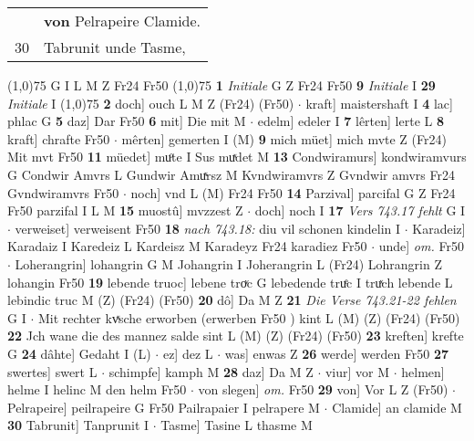 \documentclass[8pt,a4paper,notitlepage]{article}
\begin{document}
\begin{table}[ht]
\begin{minipage}[t]{0.5\linewidth}
\begin{tabular}{rl}
 & \textbf{von} Pelrapeire Clamide.\\ 
30 & Tabrunit unde Tasme,\\ 
\end{tabular}
\scriptsize
\line(1,0){75} \newline
G I L M Z Fr24 Fr50 \newline
\line(1,0){75} \newline
\textbf{1} \textit{Initiale} G Z Fr24 Fr50  \textbf{9} \textit{Initiale} I  \textbf{29} \textit{Initiale} I  \newline
\line(1,0){75} \newline
\textbf{2} doch] ouch L M Z (Fr24) (Fr50)  $\cdot$ kraft] maistershaft I \textbf{4} lac] phlac G \textbf{5} daz] Dar Fr50 \textbf{6} mit] Die mit M  $\cdot$ edelm] edeler I \textbf{7} lêrten] lerte L \textbf{8} kraft] chrafte Fr50  $\cdot$ mêrten] gemerten I (M) \textbf{9} mich müet] mich mvte Z (Fr24) Mit mvt Fr50 \textbf{11} müedet] muͦte I Sus muͯdet M \textbf{13} Condwiramurs] kondwiramvurs G Condwir Amvrs L Gundwir Amuͯrsz M Kvndwiramvrs Z Gvndwir amvrs Fr24 Gvndwiramvrs Fr50  $\cdot$ noch] vnd L (M) Fr24 Fr50 \textbf{14} Parzival] parcifal G Z Fr24 Fr50 parzifal I L M \textbf{15} muostû] mvzzest Z  $\cdot$ doch] noch I \textbf{17} \textit{Vers 743.17 fehlt} G I   $\cdot$ verweiset] verweisent Fr50 \textbf{18} \textit{nach 743.18:} diu vil schonen kindelin I   $\cdot$ Karadeiz] Karadaiz I Karedeiz L Kardeisz M Karadeyz Fr24 karadiez Fr50  $\cdot$ unde] \textit{om.} Fr50  $\cdot$ Loherangrin] lohangrin G M Johangrin I Joherangrin L (Fr24) Lohrangrin Z lohangin Fr50 \textbf{19} lebende truoc] lebene troͮc G lebedende truͤc I truͯch lebende L lebindic truc M (Z) (Fr24) (Fr50) \textbf{20} dô] Da M Z \textbf{21} \textit{Die Verse 743.21-22 fehlen} G I   $\cdot$ Mit rechter kvͯsche erworben (erwerben Fr50 ) kint L (M) (Z) (Fr24) (Fr50) \textbf{22} Jch wane die des mannez salde sint L (M) (Z) (Fr24) (Fr50) \textbf{23} kreften] krefte G \textbf{24} dâhte] Gedaht I (L)  $\cdot$ ez] dez L  $\cdot$ was] enwas Z \textbf{26} werde] werden Fr50 \textbf{27} swertes] swert L  $\cdot$ schimpfe] kamph M \textbf{28} daz] Da M Z  $\cdot$ viur] vor M  $\cdot$ helmen] helme I helinc M den helm Fr50  $\cdot$ von slegen] \textit{om.} Fr50 \textbf{29} von] Vor L Z (Fr50)  $\cdot$ Pelrapeire] peilrapeire G Fr50 Pailrapaier I pelrapere M  $\cdot$ Clamide] an clamide M \textbf{30} Tabrunit] Tanprunit I  $\cdot$ Tasme] Tasine L thasme M \newline
\end{minipage}
\hspace{0.5cm}

\end{table}
\end{document}
